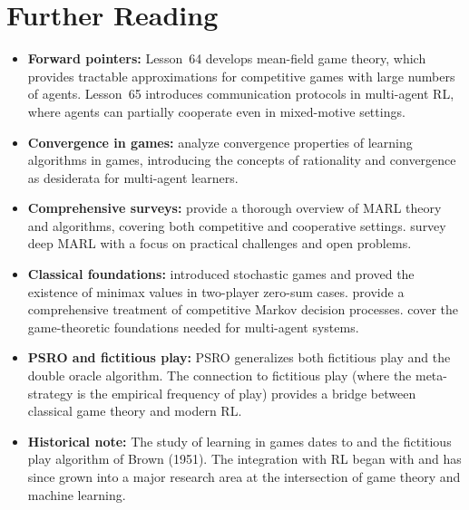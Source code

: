 \documentclass[11pt,a4paper]{article}
\begin{document}
\section{Further Reading}

\begin{itemize}
  \item \textbf{Forward pointers:} Lesson~64 develops mean-field game
    theory, which provides tractable approximations for competitive
    games with large numbers of agents.  Lesson~65 introduces
    communication protocols in multi-agent RL, where agents can
    partially cooperate even in mixed-motive settings.

  \item \textbf{Convergence in games:} \citet{bowling2001} analyze
    convergence properties of learning algorithms in games, introducing
    the concepts of rationality and convergence as desiderata for
    multi-agent learners.

  \item \textbf{Comprehensive surveys:} \citet{zhang2021} provide a
    thorough overview of MARL theory and algorithms, covering both
    competitive and cooperative settings.
    \citet{hernandezleal2019} survey deep MARL with a focus on
    practical challenges and open problems.

  \item \textbf{Classical foundations:} \citet{shapley1953} introduced
    stochastic games and proved the existence of minimax values in
    two-player zero-sum cases.  \citet{filar1997} provide a comprehensive
    treatment of competitive Markov decision processes.
    \citet{shoham2008} cover the game-theoretic foundations needed for
    multi-agent systems.

  \item \textbf{PSRO and fictitious play:} PSRO \citep{lanctot2017}
    generalizes both fictitious play and the double oracle algorithm.
    The connection to fictitious play (where the meta-strategy is the
    empirical frequency of play) provides a bridge between classical
    game theory and modern RL.

  \item \textbf{Historical note:} The study of learning in games dates
    to \citet{shapley1953} and the fictitious play algorithm of Brown
    (1951).  The integration with RL began with \citet{littman1994}
    and has since grown into a major research area at the intersection
    of game theory and machine learning.
\end{itemize}


\end{document}
